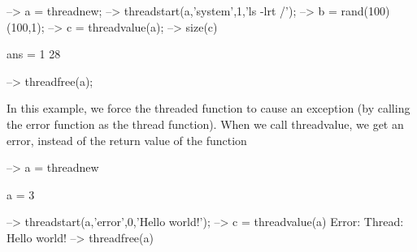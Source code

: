 \begin{DoxyVerbInclude}
--> a = threadnew;                         %
--> threadstart(a,'system',1,'ls -lrt /'); %
--> b = rand(100)\rand(100,1);             %
--> c = threadvalue(a);                    %
--> size(c)                                %

ans = 
  1 28 

--> threadfree(a);
\end{DoxyVerbInclude}


In this example, we force the threaded function to cause an exception (by calling the {\ttfamily error} function as the thread function). When we call {\ttfamily threadvalue}, we get an error, instead of the return value of the function


\begin{DoxyVerbInclude}
--> a = threadnew

a = 
 3 

--> threadstart(a,'error',0,'Hello world!'); %
--> c = threadvalue(a)                     %
Error: Thread: Hello world!
--> threadfree(a)
\end{DoxyVerbInclude}


